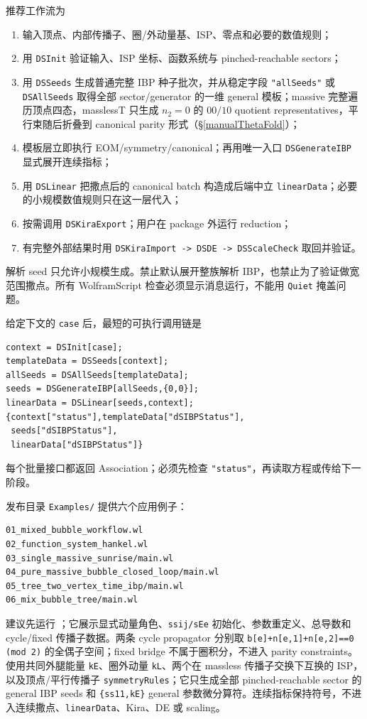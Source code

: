 ﻿\documentclass[a4paper,11pt]{article}
\begin{document}
推荐工作流为
\begin{enumerate}
  \item 输入顶点、内部传播子、圈/外动量基、ISP、零点和必要的数值规则；
  \item 用 \texttt{DSInit} 验证输入、ISP 坐标、函数系统与 pinched-reachable sectors；
  \item 用 \texttt{DSSeeds} 生成普通完整 IBP 种子批次，并从稳定字段 \texttt{"allSeeds"} 或 \texttt{DSAllSeeds} 取得全部 sector/generator 的一维 general 模板；massive 完整遍历顶点四态，masslessT 只生成 $n_2=0$ 的 $00/10$ quotient representatives，平行束随后折叠到 canonical parity 形式（\S\ref{manualThetaFold}）；
  \item 模板层立即执行 EOM/symmetry/canonical；再用唯一入口 \texttt{DSGenerateIBP} 显式展开连续指标；
  \item 用 \texttt{DSLinear} 把撒点后的 canonical batch 构造成后端中立 \texttt{linearData}；必要的小规模数值规则只在这一层代入；
  \item 按需调用 \texttt{DSKiraExport}；用户在 package 外运行 reduction；
  \item 有完整外部结果时用 \texttt{DSKiraImport -> DSDE -> DSScaleCheck} 取回并验证。
\end{enumerate}

\begin{proofbox}
解析 seed 只允许小规模生成。禁止默认展开整族解析 IBP，也禁止为了验证做宽范围撒点。所有 WolframScript 检查必须显示消息运行，不能用 \texttt{Quiet} 掩盖问题。
\end{proofbox}

给定下文的 \texttt{case} 后，最短的可执行调用链是
\begin{verbatim}
context = DSInit[case];
templateData = DSSeeds[context];
allSeeds = DSAllSeeds[templateData];
seeds = DSGenerateIBP[allSeeds,{0,0}];
linearData = DSLinear[seeds,context];
{context["status"],templateData["dSIBPStatus"],
 seeds["dSIBPStatus"],
 linearData["dSIBPStatus"]}
\end{verbatim}
每个批量接口都返回 Association；必须先检查 \texttt{"status"}，再读取方程或传给下一阶段。

发布目录 \texttt{Examples/} 提供六个应用例子：
\begin{verbatim}
01_mixed_bubble_workflow.wl
02_function_system_hankel.wl
03_single_massive_sunrise/main.wl
04_pure_massive_bubble_closed_loop/main.wl
05_tree_two_vertex_time_ibp/main.wl
06_mix_bubble_tree/main.wl
\end{verbatim}
建议先运行 ；它展示显式动量角色、\texttt{ssij/sEe} 初始化、参数重定义、总导数和 cycle/fixed 传播子数据。两条 cycle propagator 分别取
\texttt{b[e]+n[e,1]+n[e,2]==0 (mod 2)} 的全偶子空间；fixed bridge 不属于圈积分，不进入 parity constraints。 使用共同外腿能量 \texttt{kE}、圈外动量 \texttt{kL}、两个在 massless 传播子交换下互换的 ISP，以及顶点/平行传播子 \texttt{symmetryRules}；它只生成全部 pinched-reachable sector 的 general IBP seeds 和 \texttt{\{ss11,kE\}} general 参数微分算符。连续指标保持符号，不进入连续撒点、\texttt{linearData}、Kira、DE 或 scaling。
\end{document}
